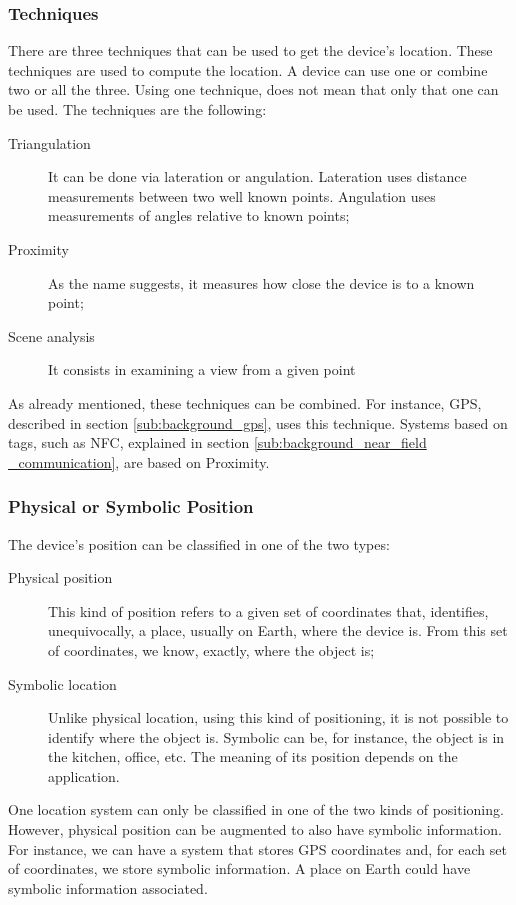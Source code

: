 \subsubsection{Techniques}
\label{sub:background_techniques}
There are three techniques that can be used to get the device's location.
These techniques are used to compute the location.
A device can use one or combine two or all the three.
Using one technique, does not mean that only that one can be used.
The techniques are the following:
\begin{description}
  \item[Triangulation] It can be done via lateration or angulation. Lateration uses distance measurements between two well known points.
  Angulation uses measurements of angles relative to known points;
  \item[Proximity] As the name suggests, it measures how close the device is to a known point;
  \item[Scene analysis] It consists in examining a view from a given point
\end{description}

As already mentioned, these techniques can be combined.
For instance, \gls{GPS}, described in section \ref{sub:background_gps}, uses this technique.
Systems based on tags, such as \gls{NFC}, explained in section \ref{sub:background_near_field _communication}, are based on Proximity.

\subsubsection{Physical or Symbolic Position}
\label{sub:background_physical_or_symbolic_position}
The device's position can be classified in one of the two types:
\begin{description}
  \item[Physical position] This kind of position refers to a given set of coordinates that, identifies, unequivocally, a place, usually on Earth, where the device is. From this set of coordinates, we know, exactly, where the object is;
  \item[Symbolic location] Unlike physical location, using this kind of positioning, it is not possible to identify where the object is. Symbolic can be, for instance, the object is in the kitchen, office, etc. The meaning of its position depends on the application.
\end{description}

One location system can only be classified in one of the two kinds of positioning.
However, physical position can be augmented to also have symbolic information.
For instance, we can have a system that stores \gls{GPS} coordinates and, for each set of coordinates, we store symbolic information.
A place on Earth could have symbolic information associated.

